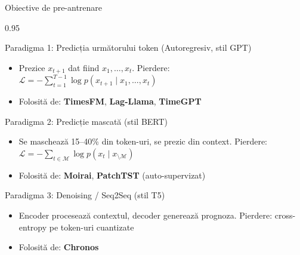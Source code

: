 \documentclass[9pt, aspectratio=169, t]{beamer}
\begin{document}
\begin{frame}{Obiective de pre-antrenare}
    \begin{cminipage}{0.95\textwidth}
    \vspace{-3mm}
    {\scriptsize
    \begin{block}{Paradigma 1: Predicția următorului token (Autoregresiv, stil GPT)}
        \vspace{-1mm}
        \begin{itemize}\setlength{\itemsep}{0pt}
            \item Prezice $x_{t+1}$ dat fiind $x_1, \ldots, x_t$. Pierdere: $\mathcal{L} = -\sum_{t=1}^{T-1} \log p(x_{t+1} \mid x_1, \ldots, x_t)$
            \item Folosită de: \textbf{TimesFM}, \textbf{Lag-Llama}, \textbf{TimeGPT}
        \end{itemize}
        \vspace{-1mm}
    \end{block}
    \vspace{-2mm}
    \begin{alertblock}{Paradigma 2: Predicție mascată (stil BERT)}
        \vspace{-1mm}
        \begin{itemize}\setlength{\itemsep}{0pt}
            \item Se maschează 15--40\% din token-uri, se prezic din context. Pierdere: $\mathcal{L} = -\sum_{t \in \mathcal{M}} \log p(x_t \mid x_{\setminus \mathcal{M}})$
            \item Folosită de: \textbf{Moirai}, \textbf{PatchTST} (auto-supervizat)
        \end{itemize}
        \vspace{-1mm}
    \end{alertblock}
    \vspace{-2mm}
    \begin{exampleblock}{Paradigma 3: Denoising / Seq2Seq (stil T5)}
        \vspace{-1mm}
        \begin{itemize}\setlength{\itemsep}{0pt}
            \item Encoder procesează contextul, decoder generează prognoza. Pierdere: cross-entropy pe token-uri cuantizate
            \item Folosită de: \textbf{Chronos}
        \end{itemize}
        \vspace{-1mm}
    \end{exampleblock}
    }
    \end{cminipage}
\end{frame}
\end{document}
